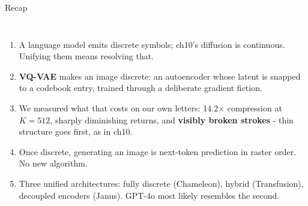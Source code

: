 \documentclass[aspectratio=169]{beamer}
\begin{document}
\begin{frame}{Recap}
  \small
  \begin{columns}[T]
    \begin{enumerate}\scriptsize\itemsep 2.5pt
      \item A language model emits discrete symbols; ch10's diffusion is continuous.
        Unifying them means resolving that.
      \item \textbf{VQ-VAE} makes an image discrete: an autoencoder whose latent is snapped
        to a codebook entry, trained through a deliberate gradient fiction.
      \item We measured what that costs on our own letters: 14.2$\times$ compression at
        $K{=}512$, sharply diminishing returns, and \textbf{visibly broken strokes} - thin
        structure goes first, as in ch10.
      \item Once discrete, generating an image is next-token prediction in raster order.
        No new algorithm.
      \item Three unified architectures: fully discrete (Chameleon), hybrid (Transfusion),
        decoupled encoders (Janus). GPT-4o most likely resembles the second.
    \end{enumerate}
    \vskip 10pt
    \vskip 5pt
  \end{columns}
\end{frame}
\end{document}
